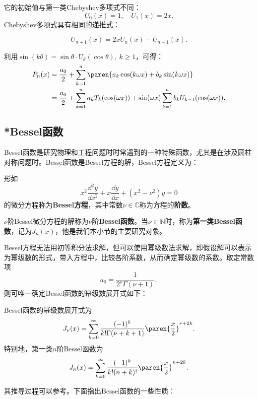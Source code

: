 它的初始值与第一类Chebyshev多项式不同：
\begin{equation}
    U_0(x)=1,\quad U_1(x)=2x.
\end{equation}
Chebyshev多项式具有相同的递推式：
\begin{theorem}[第二类Chebyshev多项式的递推公式]
    \begin{equation}
        U_{n+1}(x)=2xU_n(x)-U_{n-1}(x).
    \end{equation}
\end{theorem}

利用$\sin(k\theta)=\sin\theta \cdot U_k(\cos\theta),\ k\ge 1$，可得：
\begin{align}
    P_n(x)&=\frac{a_0}{2}+\sum_{k=1}^n\paren{a_k\cos(k\omega x)+b_k\sin(k\omega x)}\nonumber\\
    &=\frac{a_0}{2}+\sum_{k=1}^n a_k T_k(\cos(\omega x))+\sin(\omega x)\sum_{k=1}^n b_k U_{k-1}(\cos(\omega x)).
\end{align}

\subsection{*Bessel函数}\label{sub:bessel}

Bessel函数是研究物理和工程问题时时常遇到的一种特殊函数，尤其是在涉及圆柱对称问题时。Bessel函数是Bessel方程的解，Bessel方程定义为：
\begin{definition}[Bessel方程]
    形如
    \begin{equation}
        x^2\frac{\dd^2 y}{\dd x^2}+x\frac{\dd y}{\dd x}+(x^2-\nu^2)y=0
    \end{equation}
    的微分方程称为\textbf{Bessel方程}，其中常数$\nu\in\mathbb{C}$称为方程的\textbf{阶数}。
\end{definition}
\begin{definition}[Bessel函数]
    $\nu$阶Bessel微分方程的解称为$\nu$阶\textbf{Bessel函数}。当$\nu\in\mathbb{N}$时，称为\textbf{第一类Bessel函数}，记为$J_n(x)$，他是我们本小节的主要研究对象。
\end{definition}

Bessel方程无法用初等积分法求解，但可以使用幂级数法求解，即假设解可以表示为幂级数的形式，带入方程中，比较各阶系数，从而确定幂级数的系数。取定常数项
\begin{equation}
    a_0=\frac{1}{2^\nu\Gamma(\nu+1)},
\end{equation}
则可唯一确定Bessel函数的幂级数展开式如下：
\begin{theorem}
    Bessel函数的幂级数展开式为
    \begin{equation}
        J_{\nu}(x)=\sum_{k=0}^{\infty}\frac{(-1)^k}{k!\Gamma(\nu+k+1)}\paren{\frac{x}{2}}^{\nu+2k}.
    \end{equation}
    特别地，第一类$n$阶Bessel函数为
    \begin{equation}
        J_{n}(x)=\sum_{k=0}^{\infty}\frac{(-1)^k}{k!(n+k)!}\paren{\frac{x}{2}}^{n+2k}.
    \end{equation}
\end{theorem}
其推导过程可以参考\cite{folland}。下面指出Bessel函数的一些性质：

